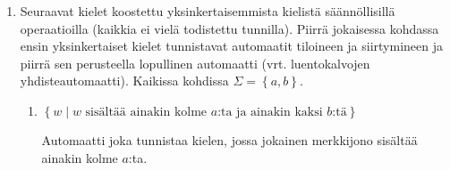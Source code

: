 \documentclass[a4paper,11pt,draft]{article}
\newcommand{\set}[1]{{\left\{ #1 \right\}}}
\begin{document}
\begin{enumerate}
\begin{proof}
\begin{proof}
\begin{description}
\begin{description}
            Jos $i \ge n+1$, niin $i+1 > n+1$. Tarkastellaan siis tapausta
            $i < n+1$. Nyt
%
            \begin{align*}
              q_{i+1} &= \delta_{A-B}(q_i, w_i)
                         &\text{$q_{i+1}$:n määritelmä}\\
                      &= \delta_{A-B}((r_i, p_i), w_i)
                         &\text{induktio-oletus} \\
                      &= (\delta_A(r_i, w_i), \delta_B(p_i, w_i))
                         &\text{$\delta_{A-B}$:n määritelmä}\\
                      &= (r_{i+1}, p_{i+1})
                         &\text{$r_{i+1}$:n ja $p_{i+1}$:n määritelmät.}
            \end{align*}
          \end{description}
      \end{description}
    \end{proof}
%

    Automaatti $M_{A-B}$ hyväksyy merkkijonon $w$ jos ja vain jos
    $q_{n+1} \in F_{A-B}$. Näytetään nyt, että $M_{A-B}$ hyväksyy merkkijonon
    $w$ täsmälleen silloin kun $w$ kuuluu kieleen $A -B$.
%
    \begin{align*}
      q_{n+1} \in F_{A-B}
      &\Leftrightarrow (r_{n+1}, p_{n+1}) \in F_{A-B} \\
      &\Leftrightarrow r_{n+1} \in F_A \text{ ja } p_{n+1} \notin F_B \\
      &\Leftrightarrow w \in A \text{ ja } w \notin B \\
      &\Leftrightarrow w \in A - B.
    \end{align*}
%
    Siis kieli $A - B$ on säännöllinen.
  \end{proof}

\item
  Seuraavat kielet koostettu yksinkertaisemmista kielistä
  säännöllisillä operaatioilla (kaikkia ei vielä todistettu tunnilla).
  Piirrä jokaisessa kohdassa ensin yksinkertaiset kielet tunnistavat
  automaatit tiloineen ja siirtymineen ja piirrä sen perusteella
  lopullinen automaatti (vrt. luentokalvojen yhdisteautomaatti).
  Kaikissa kohdissa $\Sigma = \set{a,b}$.
  \begin{enumerate}
  \item 
    $\set{w \mid \mbox{$w$ sisältää ainakin kolme $a$:ta ja ainakin
      kaksi $b$:tä}}$

    Automaatti joka tunnistaa kielen, jossa jokainen merkkijono
    sisältää ainakin kolme $a$:ta.


\end{enumerate}
\end{enumerate}
\end{document}

